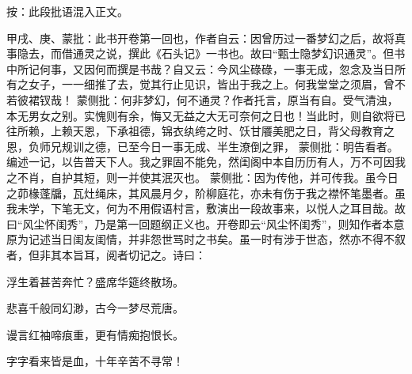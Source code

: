 
\begin{parag}
    \begin{note} \begin{subnote} 按：此段批语混入正文。\end{subnote}
        甲戌、庚、蒙批：此书开卷第一回也，作者自云：因曾历过一番梦幻之后，故将真事隐去，而借通灵之说，撰此《石头记》一书也。故曰“甄士隐梦幻识通灵”。但书中所记何事，又因何而撰是书哉？自又云：今风尘碌碌，一事无成，忽念及当日所有之女子，一一细推了去，觉其行止见识，皆出于我之上。何我堂堂之须眉，曾不若彼裙钗哉！ 蒙侧批：何非梦幻，何不通灵？作者托言，原当有自。受气清浊，本无男女之别。实愧则有余，悔又无益之大无可奈何之日也！当此时，则自欲将已往所赖，上赖天恩，下承祖德，锦衣纨绔之时、饫甘餍美肥之日，背父母教育之恩，负师兄规训之德，已至今日一事无成、半生潦倒之罪， 蒙侧批：明告看者。编述一记，以告普天下人。我之罪固不能免，然闺阁中本自历历有人，万不可因我之不肖，自护其短，则一并使其泯灭也。 蒙侧批：因为传他，并可传我。虽今日之茆椽蓬牖，瓦灶绳床，其风晨月夕，阶柳庭花，亦未有伤于我之襟怀笔墨者。虽我未学，下笔无文，何为不用假语村言，敷演出一段故事来，以悦人之耳目哉。故曰“风尘怀闺秀”，乃是第一回题纲正义也。开卷即云“风尘怀闺秀”，则知作者本意原为记述当日闺友闺情，并非怨世骂时之书矣。虽一时有涉于世态，然亦不得不叙者，但非其本旨耳，阅者切记之。诗曰：
    \end{note}

\end{parag}
\begin{poem}
    \begin{pl}\begin{note} 浮生着甚苦奔忙？盛席华筵终散场。\end{note}\end{pl}

    \begin{pl}\begin{note} 悲喜千般同幻渺，古今一梦尽荒唐。\end{note}\end{pl}

    \begin{pl}\begin{note} 谩言红袖啼痕重，更有情痴抱恨长。\end{note}\end{pl}

    \begin{pl}\begin{note} 字字看来皆是血，十年辛苦不寻常！\end{note}\end{pl}
\end{poem}

